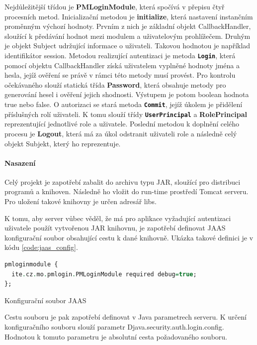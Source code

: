 \documentclass[thesis=M,czech]{FITthesis}[2012/06/26]
\begin{document}
Nejdůležitější třídou je \textbf{PMLoginModule}, která spočívá v přepisu čtyř procesních metod. Inicializační metodou je \textbf{initialize}, která nastavení instančním proměnným výchozí hodnoty. Prvním z nich je základní objekt CallbackHandler, sloužící k předávání hodnot mezi modulem a uživatelovým prohlížečem. Druhým je objekt Subject udržující informace o uživateli. Takovou hodnotou je například identifikátor session. Metodou realizující autentizaci je metoda \texttt{\textbf{Login}}, která pomocí objektu CallbackHandler získá uživatelem vyplněné hodnoty jména a hesla, jejíž ověření se právě v rámci této metody musí provést. Pro kontrolu očekávaného slouží statická třída \textbf{Password}, která obsahuje metody pro generování hesel i ověření jejich shodnosti. Výstupem je potom boolean hodnota true nebo false. O autorizaci se stará metoda \texttt{\textbf{Commit}}, jejíž úkolem je přidělení příslušných rolí uživateli. K tomu slouží třídy \texttt{\textbf{UserPrincipal}} a \textbf{RolePrincipal} reprezentující jednotlivé role a uživatele. Poslední metodou k doplnění celého procesu je \textbf{Logout}, která má za úkol odstranit uživateli role a následně celý objekt Subjekt, který ho reprezentuje.

\paragraph{Nasazení} Celý projekt je zapotřebí zabalit do archivu typu JAR, sloužící pro distribuci programů a knihoven. Následně ho vložit do run-time prostředí Tomcat serveru. Pro uložení takové knihovny je určen adresář libs.

K tomu, aby server vůbec věděl, že má pro aplikace vyžadující autentizaci uživatele použít vytvořenou JAR knihovnu, je zapotřebí definovat JAAS konfigurační soubor obsahující cestu k dané knihovně. Ukázka takové definici je v kódu \ref{code:jaas_config}. 

\begin{algorithm}[H]	
	\begin{lstlisting}[language = VHDL]  
pmloginmodule {
  ite.cz.mo.pmlogin.PMLoginModule required debug=true;
};
	\end{lstlisting}
	\caption{Konfigurační soubor JAAS}	
	\label{code:jaas_config}
\end{algorithm}	

Cestu souboru je pak zapotřebí definovat v Java parametrech serveru. K určení konfiguračního souboru slouží parametr Djava.security.auth.login.config. Hodnotou k tomuto parametru je absolutní cesta požadovaného souboru.
\end{document}
